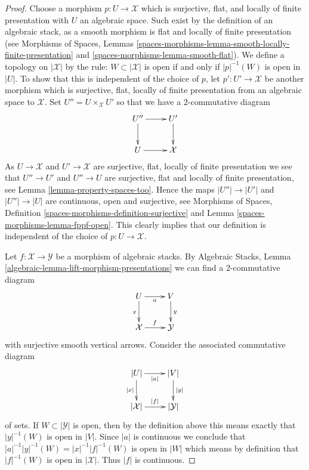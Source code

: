 \documentclass{stacks-project}
\theoremstyle{plain}
\theoremstyle{definition}
\theoremstyle{remark}
\numberwithin{equation}{subsection}
\begin{document}
\begin{proof}
Choose a morphism $p : U \to \mathcal{X}$ which is
surjective, flat, and locally of finite presentation
with $U$ an algebraic space. Such exist by the definition of an algebraic
stack, as a smooth morphism is flat and locally of finite presentation
(see
Morphisms of Spaces,
Lemmas \ref{spaces-morphisms-lemma-smooth-locally-finite-presentation} and
\ref{spaces-morphisms-lemma-smooth-flat}).
We define a topology on $|\mathcal{X}|$ by the rule:
$W \subset |\mathcal{X}|$ is open if and only if $|p|^{-1}(W)$ is open
in $|U|$. To show that this is independent of the choice of $p$, let
$p' : U' \to \mathcal{X}$ be another morphism which is surjective, flat,
locally of finite presentation from an algebraic space to
$\mathcal{X}$. Set $U'' = U \times_\mathcal{X} U'$
so that we have a $2$-commutative diagram
$$
\xymatrix{
U'' \ar[r] \ar[d] & U' \ar[d] \\
U \ar[r] & \mathcal{X}
}
$$
As $U \to \mathcal{X}$ and $U' \to \mathcal{X}$ are surjective, flat,
locally of finite presentation we see that $U'' \to U'$ and $U'' \to U$
are surjective, flat and locally of finite presentation, see
Lemma \ref{lemma-property-spaces-too}.
Hence the maps $|U''| \to |U'|$ and $|U''| \to |U|$ are continuous, open
and surjective, see
Morphisms of Spaces,
Definition \ref{spaces-morphisms-definition-surjective} and
Lemma \ref{spaces-morphisms-lemma-fppf-open}.
This clearly implies that our definition is independent of the choice
of $p : U \to \mathcal{X}$.

\medskip\noindent
Let $f : \mathcal{X} \to \mathcal{Y}$ be a morphism of algebraic stacks.
By
Algebraic Stacks, Lemma \ref{algebraic-lemma-lift-morphism-presentations}
we can find a $2$-commutative diagram
$$
\xymatrix{
U \ar[d]_x \ar[r]_a & V \ar[d]^y \\
\mathcal{X} \ar[r]^f & \mathcal{Y}
}
$$
with surjective smooth vertical arrows.
Consider the associated commutative diagram
$$
\xymatrix{
|U| \ar[d]_{|x|} \ar[r]_{|a|} & |V| \ar[d]^{|y|} \\
|\mathcal{X}| \ar[r]^{|f|} & |\mathcal{Y}|
}
$$
of sets. If $W \subset |\mathcal{Y}|$ is open, then by the definition
above this means exactly that $|y|^{-1}(W)$ is open in $|V|$. Since
$|a|$ is continuous we conclude that
$|a|^{-1}|y|^{-1}(W) = |x|^{-1}|f|^{-1}(W)$ is open in $|W|$ which means
by definition that $|f|^{-1}(W)$ is open in $|\mathcal{X}|$.
Thus $|f|$ is continuous.


\end{proof}
\end{document}
